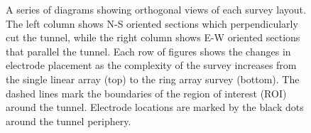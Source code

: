 \documentclass[preprint,authoryear,12pt]{elsarticle}
\providecommand{\DIFdelbegin}{} %
\providecommand{\DIFdelendFL}{} %
\begin{document}
\begin{figure}[htp]{}
\begin{center}
   \DIFdelendFL \end{center}
\vspace{-0.4cm}
\caption{A series of diagrams showing orthogonal views of each survey layout. The left column shows N-S oriented sections which perpendicularly cut the tunnel, while the right column shows E-W oriented sections that parallel the tunnel. Each row of figures shows the changes in electrode placement as the complexity of the survey increases from the single linear array (top) to the ring array survey (bottom). The dashed lines mark the boundaries of the region of interest (ROI) around the tunnel. Electrode locations are marked by the black dots around the tunnel periphery.}
\label{fig:SurveyDesign_StraightTunnel_Layout}
\end{figure}


\DIFdelbegin %
\end{document}
